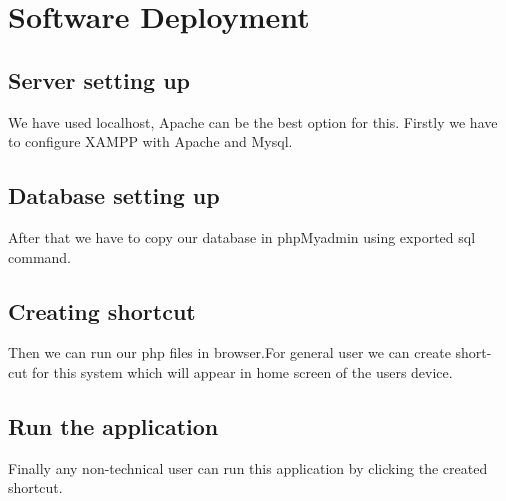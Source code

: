 \section{Software Deployment}\label{sec:sd}
\subsection{Server setting up}
 We have used localhost, Apache can be the best option for this. Firstly we have to
configure XAMPP with Apache and Mysql.
 \subsection{Database setting up}
After that we have to copy our database in phpMyadmin using exported sql
command.
 \subsection{Creating shortcut}

Then we can run our php files in browser.For general user we can create short-
cut for this system which will appear in home screen of the users device.

\subsection{ Run the application}
Finally any non-technical user can run this application by clicking the created
shortcut. 

\clearpage